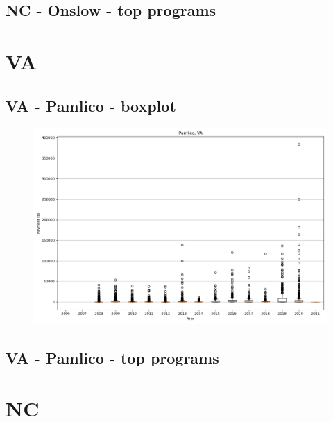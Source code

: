 \subsection*{NC - Onslow - top programs}

\newpage
\section*{VA}
\subsection*{VA - Pamlico - boxplot}
\begin{figure}[h]
\centering
\includegraphics[width=7in]{../output/boxplots/counties/Pamlico-VA_boxplot.png}
\end{figure}


\subsection*{VA - Pamlico - top programs}

\newpage
\section*{NC}
